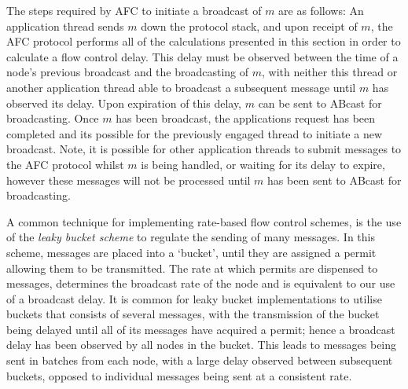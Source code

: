      The steps required by AFC to initiate a broadcast of $m$ are as follows: An application thread sends $m$ down the protocol stack, and upon receipt of $m$, the AFC protocol performs all of the calculations presented in this section in order to calculate a flow control delay.  This delay must be observed between the time of a node's previous broadcast and the broadcasting of $m$, with neither this thread or another application thread able to broadcast a subsequent message until $m$ has observed its delay.  Upon expiration of this delay, $m$ can be sent to \textsf{ABcast} for broadcasting.  Once $m$ has been broadcast, the applications request has been completed and its possible for the previously engaged thread to initiate a new broadcast.  Note, it is possible for other application threads to submit messages to the AFC protocol whilst $m$ is being handled, or waiting for its delay to expire, however these messages will not be processed until $m$ has been sent to \textsf{ABcast} for broadcasting.  
   
    A common technique for implementing rate-based flow control schemes, is the use of the \emph{leaky bucket scheme} \citep{Jain:1996:CCT:244118.244120, bertsekas1992DataNetworksFC} to regulate the sending of many messages.  In this scheme, messages are placed into a \textquoteleft{}bucket', until they are assigned a permit allowing them to be transmitted.  The rate at which permits are dispensed to messages, determines the broadcast rate of the node and is equivalent to our use of a broadcast delay.  It is common for  leaky bucket implementations to utilise buckets that consists of several messages, with the transmission of the bucket being delayed until all of its messages have acquired a permit; hence a broadcast delay has been observed by all nodes in the bucket.  This leads to messages being sent in batches from each node, with a large delay observed between subsequent buckets, opposed to individual messages being sent at a consistent rate.  
    
